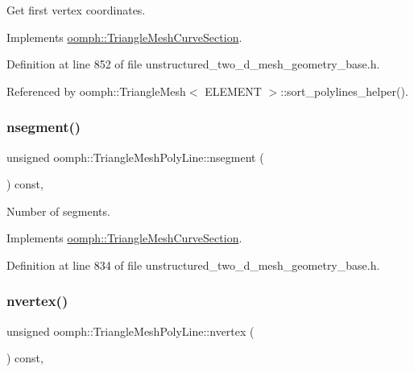 Get first vertex coordinates. 



Implements \hyperlink{classoomph_1_1TriangleMeshCurveSection_a08c60883b595a52280c486badf8a4210}{oomph\+::\+Triangle\+Mesh\+Curve\+Section}.



Definition at line 852 of file unstructured\+\_\+two\+\_\+d\+\_\+mesh\+\_\+geometry\+\_\+base.\+h.



Referenced by oomph\+::\+Triangle\+Mesh$<$ E\+L\+E\+M\+E\+N\+T $>$\+::sort\+\_\+polylines\+\_\+helper().

\mbox{\label{classoomph_1_1TriangleMeshPolyLine_a51af74c24abbae9b2cc881946d8f2170}} 
\subsubsection{\texorpdfstring{nsegment()}{nsegment()}}
{\footnotesize\ttfamily unsigned oomph\+::\+Triangle\+Mesh\+Poly\+Line\+::nsegment (\begin{DoxyParamCaption}{ }\end{DoxyParamCaption}) const\hspace{0.3cm}{\ttfamily [inline]}, {\ttfamily [virtual]}}



Number of segments. 



Implements \hyperlink{classoomph_1_1TriangleMeshCurveSection_a52af59a9a4f1b6adb35e5645ab8feb45}{oomph\+::\+Triangle\+Mesh\+Curve\+Section}.



Definition at line 834 of file unstructured\+\_\+two\+\_\+d\+\_\+mesh\+\_\+geometry\+\_\+base.\+h.

\mbox{\label{classoomph_1_1TriangleMeshPolyLine_a7b6ab13f61cb9f4435dc4fc4fe1fa50d}} 
\subsubsection{\texorpdfstring{nvertex()}{nvertex()}}
{\footnotesize\ttfamily unsigned oomph\+::\+Triangle\+Mesh\+Poly\+Line\+::nvertex (\begin{DoxyParamCaption}{ }\end{DoxyParamCaption}) const\hspace{0.3cm}{\ttfamily [inline]}, {\ttfamily [virtual]}}



